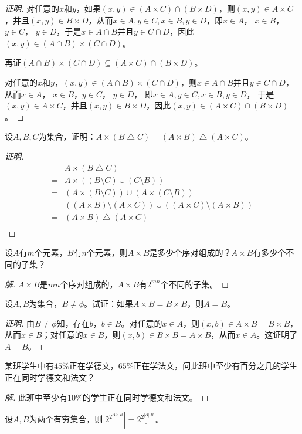 \documentclass{article}
\begin{document}
\begin{CJK}{UTF8}{gbsn}
\begin{proof}[证明]
  对任意的$x$和$y$，如果$(x,y)\in (A\times C)\cap (B \times D)$，则$(x,y)\in A\times C$，并且$(x,y)\in B \times D$，从而$x\in A,y\in C, x \in B, y\in D$，即$x\in A$， $x \in B$，$ y\in C$， $y\in D$，于是$x \in A\cap B$并且$y \in C \cap D$，因此$(x,y) \in (A\cap B) \times (C \cap D)$。
  
  再证$(A\cap B) \times (C \cap D) \subseteq (A\times C)\cap (B \times D)$。
  
    对任意的$x$和$y$，$(x,y) \in (A\cap B) \times (C \cap D)$，则$x\in A\cap B$并且$y \in C \cap D$，从而$x\in A$， $x \in B$，$ y\in C$， $y\in D$， 即$x\in A,y\in C, x \in B, y\in D$，
  于是$(x,y)\in A\times C$，并且$(x,y)\in B \times D$，因此$(x,y)\in (A\times C)\cap (B \times D)$。
  
\end{proof}
\begin{Exercise}
  设$A,B,C$为集合，证明：$A\times(B\bigtriangleup C) = (A\times B)\bigtriangleup(A\times C)$。
\end{Exercise}
\begin{proof}[证明]
  \begin{align*}
    &A\times(B\bigtriangleup C)\\
    =&A\times((B\setminus C) \cup (C\setminus B))\\
    =&(A\times (B\setminus C)) \cup (A\times (C\setminus B))\\
    =&((A\times B)\setminus (A\times C)) \cup ((A\times C)\setminus (A\times B))\\
    =&(A\times B)\bigtriangleup(A\times C)\\
  \end{align*}
\end{proof}
\begin{Exercise}
  设$A$有$m$个元素，$B$有$n$个元素，则$A\times B$是多少个序对组成的？$A\times B$有多少个不同的子集？
\end{Exercise}
\begin{proof}[解]
  $A\times B$是$mn$个序对组成的，$A\times B$有$2^{mn}$个不同的子集。
\end{proof}
\begin{Exercise}
  设$A,B$为集合，$B\neq \phi$。试证：如果$A\times B= B\times B$，则$A=B$。
\end{Exercise}
\begin{proof}[证明]
  由$B\neq \phi$知，存在$b$，$b\in B$。对任意的$x\in A$，则$(x,b)\in A\times B=B\times B$，从而$x\in B$；对任意的$x\in B$，则$(x,b)\in B\times B = A\times B$，从而$x\in A$。这证明了$A=B$。
\end{proof}
\begin{Exercise}
  某班学生中有$45\%$正在学德文，$65\%$正在学法文，问此班中至少有百分之几的学生正在同时学德文和法文？
\end{Exercise}
\begin{proof}[解]
  此班中至少有$10\%$的学生正在同时学德文和法文。
\end{proof}
\begin{Exercise}
  设$A,B$为两个有穷集合，则$|2^{2^{A\times B}}|=\underline{2^{2^{|A|\dot|B|}}}$。
\end{Exercise}


\end{CJK}
\end{document}
